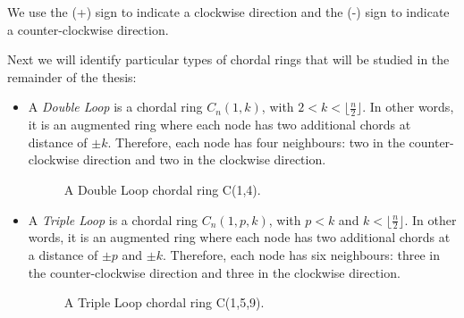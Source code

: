 We use the (+) sign to indicate a clockwise direction and the (-) sign to indicate a counter-clockwise direction.


Next we will identify particular types of chordal rings that will be studied in the remainder of the thesis:

\begin{itemize}


\item  A {\em Double Loop} is a chordal ring $C_n(1,k)$, with  $2<k<\lfloor\frac{n}{2}\rfloor$. In other words, it is an augmented ring where each node has two additional chords at distance of $\pm k$.
  Therefore, each node has four neighbours: two in the counter-clockwise direction and two in the clockwise direction. 

 


\begin{figure}[h!]
  \centering
  \caption{A Double Loop chordal ring C(1,4).}
\end{figure}
\item A {\em Triple Loop}   is a chordal ring  $C_n(1,p, k)$, with    $p<k$  and $k<\lfloor\frac{n}{2}\rfloor$. In other words, it is an augmented ring where each node has two additional chords at a distance of $\pm p$ and $\pm k$.
Therefore, each node has six neighbours: three in the counter-clockwise direction and three in the clockwise direction. 



\begin{figure}[h!]
  \centering
  \caption{A Triple Loop chordal ring C(1,5,9).}
\end{figure}


\end{itemize}
